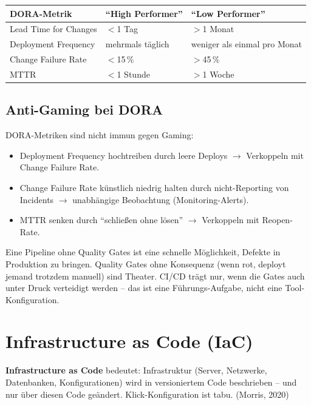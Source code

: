 \documentclass[11pt,a4paper,oneside]{article}
\newcommand{\fachbegriff}[1]{\textbf{#1}}
\newcommand{\quelle}[1]{{\footnotesize\color{lpGray}(#1)}}
\begin{document}
\begin{tabularx}{\linewidth}{@{}lXX@{}}
\toprule
DORA-Metrik & ``High Performer'' & ``Low Performer'' \\
\midrule
Lead Time for Changes & $<$1 Tag & $>$1 Monat \\
Deployment Frequency & mehrmals täglich & weniger als einmal pro Monat \\
Change Failure Rate & $<$15\,\% & $>$45\,\% \\
MTTR & $<$1 Stunde & $>$1 Woche \\
\bottomrule
\end{tabularx}

\medskip

\subsection{Anti-Gaming bei DORA}

DORA-Metriken sind nicht immun gegen Gaming:

\begin{itemize}
  \item Deployment Frequency hochtreiben durch leere Deploys $\rightarrow$ Verkoppeln mit Change Failure Rate.
  \item Change Failure Rate künstlich niedrig halten durch nicht-Reporting von Incidents $\rightarrow$ unabhängige Beobachtung (Monitoring-Alerts).
  \item MTTR senken durch ``schließen ohne lösen'' $\rightarrow$ Verkoppeln mit Reopen-Rate.
\end{itemize}

\begin{merkbox}
Eine Pipeline ohne Quality Gates ist eine schnelle Möglichkeit, Defekte in Produktion zu bringen. Quality Gates ohne Konsequenz (wenn rot, deployt jemand trotzdem manuell) sind Theater. CI/CD trägt nur, wenn die Gates auch unter Druck verteidigt werden -- das ist eine Führungs-Aufgabe, nicht eine Tool-Konfiguration.
\end{merkbox}

\section{Infrastructure as Code (IaC)}

\fachbegriff{Infrastructure as Code} bedeutet: Infrastruktur (Server, Netzwerke, Datenbanken, Konfigurationen) wird in versioniertem Code beschrieben -- und nur über diesen Code geändert. Klick-Konfiguration ist tabu. \quelle{Morris, 2020}
\end{document}
